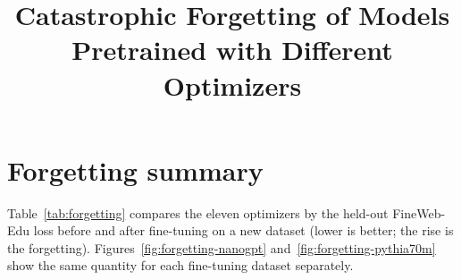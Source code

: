 \documentclass[10pt,twocolumn]{article}
\title{Catastrophic Forgetting of Models Pretrained with Different Optimizers}
\author{}
\date{}
\newcommand{\figroot}{.}               %
\begin{document}
\maketitle

\section{Forgetting summary}
Table~\ref{tab:forgetting} compares the eleven optimizers by the held-out FineWeb-Edu loss before and after fine-tuning
on a new dataset (lower is better; the rise is the forgetting). Figures~\ref{fig:forgetting-nanogpt} and~\ref{fig:forgetting-pythia70m} show the
same quantity for each fine-tuning dataset separately.



\end{document}
